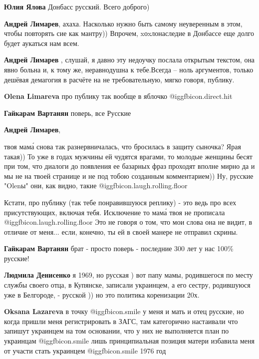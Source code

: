 \begin{itemize}
\begin{itemize}
\textbf{Юлия Ялова} Донбасс русский. Всего доброго)

\textbf{Андрей Лимарев}, ахаха. Насколько нужно быть самому неуверенным в этом, чтобы повторять сие как мантру)) Впрочем, xоxлонаследие в Донбассе еще долго будет аукаться нам всем.

\textbf{Андрей Лимарев} , слушай, я давно эту недоучку послала открытым текстом, она явно больна и, к тому же, неравнодушна к тебе.Всегда – ноль аргументов, только дешёвая демагогия в расчёте на не требовательную, мягко говоря, публику.

\textbf{Olena Limareva} про публику так вообще в яблочко  @igg{fbicon.direct.hit} 

\textbf{Гайкарам Вартанян} поверь, все Русские

\textbf{Андрей Лимарев}, 

твоя мама́ снова так разнервничалась, что бросилась в защиту сыночка? Ярая
такая)) То уже в годах мужчины ей чудятся врагами, то молодые женщины бесят при
том, что диалоги до появления ее базарных фраз проходят вполне мирно да и мы не
на твоей странице и не под тобою созданным комментарием)) Ну, русские "Olenы"
они, как видно, такие @igg{fbicon.laugh.rolling.floor} 

Кстати, про публику (так тебе понравившуюся реплику) - это ведь про всех
присутствующих, включая тебя. Исключение то мама́ твоя не прописала @igg{fbicon.laugh.rolling.floor}  Это не
говоря о том, что мои слова она не видит, в отличие от меня... если, конечно,
ты ей в своей манере не отправил скрины.

\textbf{Гайкарам Вартанян} брат - просто поверь - последние 300 лет у нас 100\% русские!

\textbf{Людмила Денисенко} я 1969, но русская ) вот папу мамы, родившегося по месту службы своего отца, в Купянске, записали украинцем, а его сестру, родившуюся уже в Белгороде, - русской )) но это политика коренизации 20х.

\textbf{Oksana Lazareva} в точку  @igg{fbicon.smile}  у меня и мать и отец русские, но когда пришли меня регистрировать в ЗАГС, там категорично настаивали что запишут украинцем на том основании, что у них не выполняется план по украинцам  @igg{fbicon.smile}  лишь принципиальная позиция матери избавила меня от участи стать украинцем  @igg{fbicon.smile}  1976 год



\end{itemize}
\end{itemize}
